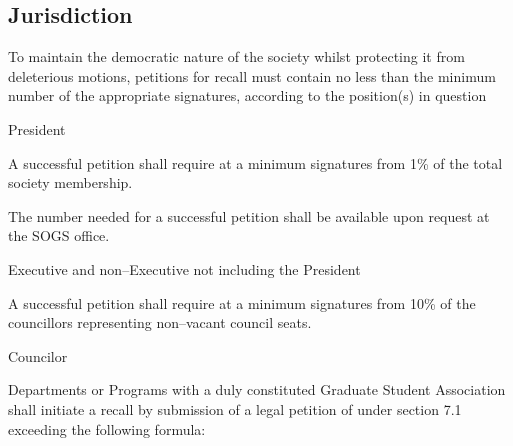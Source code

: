 \subsection{Jurisdiction}
To maintain the democratic nature of the society whilst protecting it from deleterious motions, petitions for recall must contain no less than the minimum number of the appropriate signatures, according to the position(s) in question

\begin{longenum}[ label*=\thesubsection.\arabic*., align=left]
	\item President
    \begin{longenum}[ label*=\arabic*., align=left]
		\item A successful petition shall require at a minimum signatures from 1\% of the total society membership.
    	\begin{longenum}[ label*=\arabic*., align=left]
			\item The number needed for a successful petition shall be available upon request at the SOGS office.
		\end{longenum}
	\end{longenum}
   \item Executive and non--Executive not including the President
    \begin{longenum}[ label*=\arabic*., align=left]
		\item A successful petition shall require at a minimum signatures from 10\% of the councillors representing non--vacant council seats.
	\end{longenum}
	\item Councilor
    \begin{longenum}[ label*=\arabic*., align=left]
		\item Departments or Programs with a duly constituted Graduate Student Association shall initiate a recall by submission of a legal petition of under section 7.1 exceeding the following formula: \newline
        

\end{longenum}
\end{longenum}
